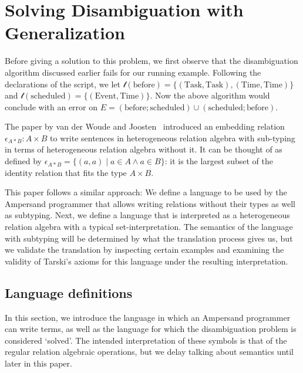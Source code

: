 \documentclass[12pt]{article}
\begin{document}
\section{Solving Disambiguation with Generalization}
Before giving a solution to this %
problem, we first observe that the disambiguation algorithm discussed earlier fails for our running example.
Following the declarations of the script, we let $\mathcal{t}(\mathrm{before}) = \{(\mathrm{Task}, \mathrm{Task}),(\mathrm{Time}, \mathrm{Time})\}$ and $\mathcal{t}(\mathrm{scheduled}) = \{(\mathrm{Event}, \mathrm{Time})\}$.
Now the above algorithm would conclude with an error on $E = (\mathrm{before};\mathrm{scheduled}) \cup (\mathrm{scheduled};\mathrm{before})$.

The paper by van der Woude and Joosten~\cite{Woude11} introduced an embedding relation $\epsilon_{A*B} : A \times B$ to write sentences in heterogeneous relation algebra with sub-typing in terms of heterogeneous relation algebra without it.
It can be thought of as defined by $\epsilon_{A*B} = \{(a,a) \mid a\in A \wedge a\in B\}$: it is the largest subset of the identity relation that fits the type $A\times B$.

This paper follows a similar approach: We define a language to be used by the Ampersand programmer that allows writing relations without their types as well as subtyping.
Next, we define a language that is interpreted as a heterogeneous relation algebra with a typical set-interpretation.
The semantics of the language with subtyping will be determined by what the translation process gives us, but we validate the translation by inspecting certain examples and examining the validity of Tarski's axioms for this language under the resulting interpretation.

\subsection{Language definitions}
In this section, we introduce the language in which an Ampersand programmer can write terms, as well as the language for which the disambiguation problem is considered `solved'.
The intended interpretation of these symbols is that of the regular relation algebraic operations, but we delay talking about semantics until later in this paper.
\end{document}
